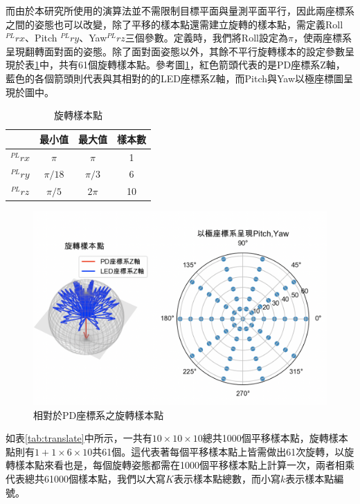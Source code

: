 而由於本研究所使用的演算法並不需限制目標平面與量測平面平行，因此兩座標系之間的姿態也可以改變，除了平移的樣本點還需建立旋轉的樣本點，需定義Roll $^{PL}rx$、Pitch $^{PL}ry$、Yaw$^{PL}rz$三個參數。定義時，我們將Roll設定為$\pi$，使兩座標系呈現翻轉面對面的姿態。除了面對面姿態以外，其餘不平行旋轉樣本的設定參數呈現於表\ref{tab:rotate}中，共有61個旋轉樣本點。參考圖\ref{pic:rotate_sample}，紅色箭頭代表的是PD座標系Z軸，藍色的各個箭頭則代表與其相對的的LED座標系Z軸，而Pitch與Yaw以極座標圖呈現於圖中。



\begin{table}[htpb]
    \begin{center}
      \caption{旋轉樣本點}
      \label{tab:rotate}
      \begin{tabular}{c|c|c|c} %
        & \textbf{最小值} & \textbf{最大值}&\textbf{樣本數}\\
       \hline
       $^{PL}rx$ & $\pi$ & $\pi$&1\\
       $^{PL}ry$ & $\pi/18$ &$\pi/3$&6\\
       $^{PL}rz$ & $\pi/5$ & $2\pi$&10\\
     \end{tabular}
   \end{center}
 \end{table}

\begin{figure}[htpb]
    \centering
    \includegraphics[width=12cm]{ch4pic/rotate_sample.png}
    \caption{相對於PD座標系之旋轉樣本點}
    \label{pic:rotate_sample}
\end{figure}


如表\ref{tab:translate}中所示，一共有$10\times 10\times 10$總共1000個平移樣本點，旋轉樣本點則有$1+1\times 6\times 10$共61個。這代表著每個平移樣本點上皆需做出61次旋轉，以旋轉樣本點來看也是，每個旋轉姿態都需在1000個平移樣本點上計算一次，兩者相乘代表總共61000個樣本點，我們以大寫$K$表示樣本點總數，而小寫$k$表示樣本點編號。







